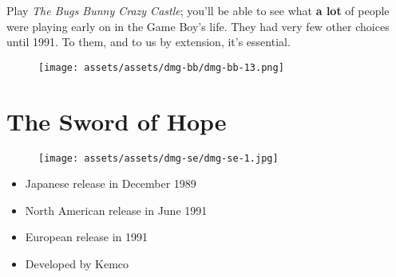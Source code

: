 \documentclass{book}
\begin{document}
Play \emph{The Bugs Bunny Crazy Castle}; you’ll be able to see what \textbf{a lot} of people were playing early on in the Game Boy’s life. They had very few other choices until 1991. To them, and to us by extension, it’s essential.

\begin{figure}[hbt]
\vskip 10pt
\centering \texttt{[image: assets/assets/dmg-bb/dmg-bb-13.png]}
\vskip 6pt
\end{figure}



\begingroup \chapter*{The Sword of Hope} \endgroup
\begin{figure}[H]
\vskip 4pt
\centering
\texttt{[image: assets/assets/dmg-se/dmg-se-1.jpg]}\end{figure}
\begin{itemize} [nosep]




\item Japanese release in December 1989







\item North American release in June 1991







\item European release in 1991

















\item Developed by Kemco

\end{itemize}\noindent
\end{document}
